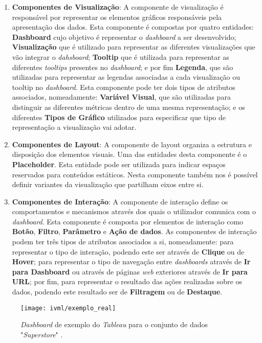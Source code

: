 \begin{enumerate}
  \item \textbf{Componentes de Visualização}: A componente de visualização é responsável por representar os elementos gráficos responsáveis pela apresentação dos dados. Esta componente é compostas por quatro entidades: \textbf{Dashboard} cujo objetivo é representar o \textit{dashboard} a ser desenvolvido; \textbf{Visualização} que é utilizado para representar as diferentes visualizações que vão integrar o \textit{dahsboard}; \textbf{Tooltip} que é utilizada para representar as diferentes \textit{tooltips} presentes no \textit{dashboard}; e por fim \textbf{Legenda}, que são utilizadas para representar as legendas associadas a cada visualização ou tooltip no \textit{dashboard}. Esta componente pode ter dois tipos de atributos associados, nomeadamente: \textbf{Variável Visual}, que são utilizadas para distinguir as diferentes métricas dentro de uma mesma representação; e os diferentes \textbf{Tipos de Gráfico} utilizados para especificar que tipo de representação a visualização vai adotar.
  \item \textbf{Componentes de Layout}: A componente de layout organiza a estrutura e disposição dos elementos visuais. Uma das entidades desta componente é o \textbf{Placeholder}. Esta entidade pode ser utilizada para indicar espaços reservados para conteúdos estáticos. Nesta componente também nos é possível definir variantes da visualização que partilham eixos entre si.
  \item \textbf{Componentes de Interação}: A componente de interação define os comportamentos e mecanismos através dos quais o utilizador comunica com o \textit{dashboard}. Esta componente é composta por elementos de interação como \textbf{Botão}, \textbf{Filtro}, \textbf{Parâmetro} e \textbf{Ação de dados}. As componentes de interação podem ter três tipos de atributos associados a si, nomeadamente: para representar o tipo de interação, podendo este ser através de \textbf{Clique} ou de \textbf{Hover}; para representar o tipo de navegação entre \textit{dashboards} através de \textbf{Ir para Dashboard} ou através de páginas \textit{web} exteriores através de \textbf{Ir para URL}; por fim, para representar o resultado das ações realizadas sobre os dados, podendo este resultado ser de \textbf{Filtragem} ou de \textbf{Destaque}.
\end{enumerate}

\begin{figure}[htbp]
  \texttt{[image: ivml/exemplo\_real]}
  \centering
  \caption{\textit{Dashboard} de exemplo do \textit{Tableau} para o conjunto de dados "\textit{Superstore}" \cite{Ferreira2023IVML}.}
  \label{fig:exemplo}
\end{figure}

